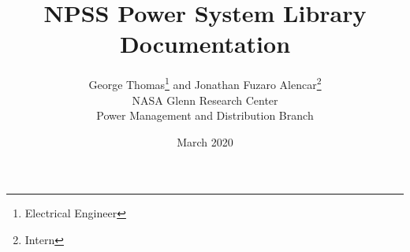 ﻿
\title{NPSS Power System Library Documentation}
\date{March 2020}
\author{George Thomas\thanks{Electrical Engineer} \enspace and Jonathan Fuzaro Alencar\thanks{Intern}\\
		NASA Glenn Research Center\\
		Power Management and Distribution Branch}
\maketitle
